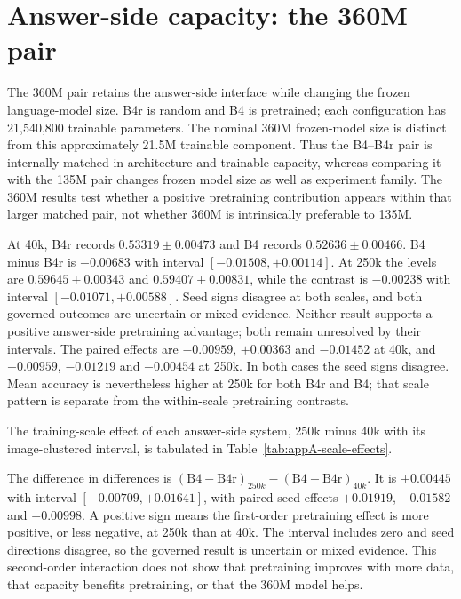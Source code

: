 \section{Answer-side capacity: the 360M pair}
\label{sec:ch6-answer360}
The 360M pair retains the answer-side interface while changing the frozen
language-model size. B4r is random and B4 is pretrained; each configuration has
21,540,800 trainable parameters. The nominal 360M frozen-model size is distinct
from this approximately 21.5M trainable component. Thus the B4--B4r pair is
internally matched in architecture and trainable capacity, whereas comparing
it with the 135M pair changes frozen model size as well as experiment family.
The 360M results test whether a positive pretraining contribution appears
within that larger matched pair, not whether 360M is intrinsically preferable
to 135M.

At 40k, B4r records $0.53319\pm0.00473$ and B4 records
$0.52636\pm0.00466$. B4 minus B4r is $-0.00683$ with interval
$[-0.01508,+0.00114]$. At 250k the levels are $0.59645\pm0.00343$ and
$0.59407\pm0.00831$, while the contrast is $-0.00238$ with interval
$[-0.01071,+0.00588]$. Seed signs disagree at both scales, and both governed
outcomes are uncertain or mixed evidence. Neither result supports a positive
answer-side pretraining advantage; both remain unresolved by their intervals.
The paired effects are $-0.00959$, $+0.00363$ and $-0.01452$ at 40k, and
$+0.00959$, $-0.01219$ and $-0.00454$ at 250k. In both cases the seed signs
disagree. Mean accuracy is nevertheless higher at 250k for both B4r and B4;
that scale pattern is separate from the within-scale pretraining contrasts.

The training-scale effect of each answer-side system, 250k minus 40k with its image-clustered interval, is tabulated in Table~\ref{tab:appA-scale-effects}.

The difference in differences is
$(\mathrm{B4}-\mathrm{B4r})_{250k}-(\mathrm{B4}-\mathrm{B4r})_{40k}$.
It is $+0.00445$ with interval $[-0.00709,+0.01641]$, with paired seed effects
$+0.01919$, $-0.01582$ and $+0.00998$. A positive sign means the first-order
pretraining effect is more positive, or less negative, at 250k than at 40k.
The interval includes zero and seed directions disagree, so the governed result
is uncertain or mixed evidence. This second-order interaction does not show
that pretraining improves with more data, that capacity benefits pretraining,
or that the 360M model helps.

